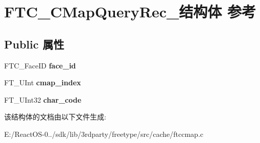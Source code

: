 \hypertarget{struct_f_t_c___c_map_query_rec__}{}\section{F\+T\+C\+\_\+\+C\+Map\+Query\+Rec\+\_\+结构体 参考}
\label{struct_f_t_c___c_map_query_rec__}
\subsection*{Public 属性}
\begin{DoxyCompactItemize}
\item 
\mbox{\label{struct_f_t_c___c_map_query_rec___afc79e3d09ae71f3ae93abcb4663fd556}} 
F\+T\+C\+\_\+\+Face\+ID {\bfseries face\+\_\+id}
\item 
\mbox{\label{struct_f_t_c___c_map_query_rec___ab494e49a868f943f88a6cddcb22434ef}} 
F\+T\+\_\+\+U\+Int {\bfseries cmap\+\_\+index}
\item 
\mbox{\label{struct_f_t_c___c_map_query_rec___ad943d0c1bfbff84ce7d631faa0dbc18e}} 
F\+T\+\_\+\+U\+Int32 {\bfseries char\+\_\+code}
\end{DoxyCompactItemize}


该结构体的文档由以下文件生成\+:\begin{DoxyCompactItemize}
\item 
E\+:/\+React\+O\+S-\/0../sdk/lib/3rdparty/freetype/src/cache/ftccmap.\+c\end{DoxyCompactItemize}
